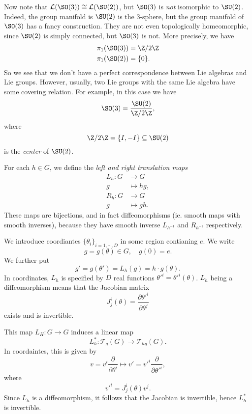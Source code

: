 \documentclass[a4paper]{article}
\begin{document}
Now note that $\mathcal{L}(\SO(3)) \cong \mathcal{L}(\SU(2))$, but $\SO(3)$ is \emph{not} isomorphic to $\SU(2)$. Indeed, the group manifold is $\SU(2)$ is the $3$-sphere, but the group manifold of $\SO(3)$ has a fancy construction. They are not even topologically homeomorphic, since $\SU(2)$ is simply connected, but $\SO(3)$ is not. More precisely, we have
\begin{align*}
  \pi_1(\SO(3)) &= \Z/2\Z\\
  \pi_1(\SO(2)) &= \{0\}.
\end{align*}
So we see that we don't have a perfect correspondence between Lie algebras and Lie groups. However, usually, two Lie groups with the same Lie algebra have some covering relation. For example, in this case we have
\[
  \SO(3) = \frac{\SU(2)}{\Z/2\Z},
\]
where
\[
  \Z/2\Z = \{I, -I\} \subseteq \SU(2)
\]
is the \emph{center} of $\SU(2)$.

\begin{defi}
  For each $h \in G$, we define the \emph{left and right translation maps}
  \begin{align*}
    L_h: G &\to G\\
    g &\mapsto hg,\\
    R_h: G &\to G\\
    g &\mapsto gh.
  \end{align*}
  These maps are bijections, and in fact diffeomorphisms (ie. smooth maps with smooth inverses), because they have smooth inverse $L_{h^{-1}}$ and $R_{h^{-1}}$ respectively.
\end{defi}

We introduce coordiantes $\{\theta_i\}_{i = 1,\cdots, D}$ in some region contianing $e$. We write
\[
  g = g(\theta) \in G,\quad g(0) = e.
\]
We further put
\[
  g' = g(\theta') = L_h(g) = h \cdot g(\theta).
\]
In coordinates, $L_h$ is specified by $D$ real functions $\theta'^i = \theta'^i(\theta)$. $L_h$ being a diffeomorphism means that the Jacobian matrix
\[
  J_j^i(\theta) = \frac{\partial \theta'^i}{\partial \theta^j}
\]
exists and is invertible.

This map $L_H: G \to G$ induces a linear map
\[
  L_h^*: \mathcal{T}_g (G) \to \mathcal{T}_{hg}(G).
\]
In coordaintes, this is given by
\[
  v = v^i \frac{\partial}{\partial \theta^i} \mapsto v' = v'^i \frac{\partial}{\partial \theta'^i},
\]
where
\[
  v'^i = J_j^i (\theta) v^j.
\]
Since $L_h$ is a diffeomorphism, it follows that the Jacobian is invertible, hence $L_h^*$ is invertible.
\end{document}
